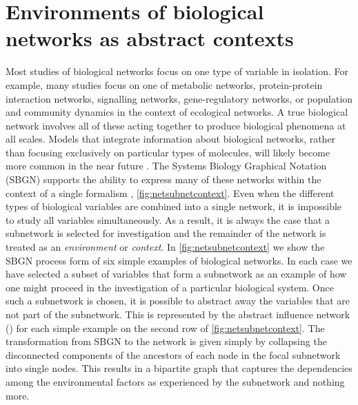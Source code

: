 
\section{Environments of biological networks as abstract contexts}\label{sec:networkcontext}
Most studies of biological networks focus on one type of variable in isolation. For example, many studies focus on one of metabolic networks, protein-protein interaction networks, signalling networks, gene-regulatory networks, or population and community dynamics in the context of ecological networks. A true biological network involves all of these acting together to produce biological phenomena at all scales. Models that integrate information about biological networks, rather than focusing exclusively on particular types of molecules, will likely become more common in the near future \cite{Covert2008,Karr2012,Macklin2014}. The Systems Biology Graphical Notation (SBGN) supports the ability to express many of these networks within the context of a single formalism \cite{LeNovere2009}, \autoref{fig:netsubnetcontext}. Even when the different types of biological variables are combined into a single network, it is impossible to study all variables simultaneously. As a result, it is always the case that a subnetwork is selected for investigation and the remainder of the network is treated as an \emph{environment} or \emph{context}. In \autoref{fig:netsubnetcontext} we show the SBGN process form of six simple examples of biological networks. In each case we have selected a subset of variables that form a subnetwork as an example of how one might proceed in the investigation of a particular biological system. Once such a subnetwork is chosen, it is possible to abstract away the variables that are not part of the subnetwork. This is represented by the abstract influence network (\AI{}) for each simple example on the second row of \autoref{fig:netsubnetcontext}. The transformation from SBGN to the \AI{} network is given simply by collapsing the disconnected components of the ancestors of each node in the focal subnetwork into single \AI{} nodes. This results in a bipartite graph that captures the dependencies among the environmental factors as experienced by the subnetwork and nothing more.


